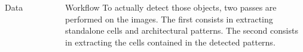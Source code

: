 \documentclass{beamer}
\begin{document}
\begin{frame}
\begin{columns}[t]
\begin{exampleblock}{Data}
\begin{figure}
\end{figure}
	
\end{exampleblock}

\begin{exampleblock}{Workflow}
To actually detect those objects, two passes are performed on the images. The first consists in extracting standalone cells and architectural patterns. The second consists in extracting the cells contained in the detected patterns. 

\begin{figure}
	\center
\end{figure}


\end{exampleblock}
\end{columns}
\end{frame}
\end{document}
